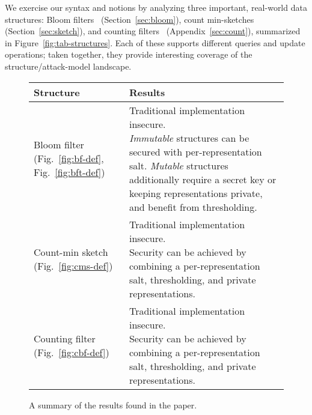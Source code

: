 
We exercise our syntax and notions by analyzing three important, real-world data
structures: Bloom filters~\cite{bloom1970space} (Section~\ref{sec:bloom}), count
min-sketches~\cite{cormode2005improved} (Section~\ref{sec:sketch}), and counting
filters~\cite{fan2000summary} (Appendix~\ref{sec:count}), summarized in
Figure~\ref{fig:tab-structures}. Each of these supports different queries and
update operations; taken together, they provide interesting coverage
of the structure/attack-model landscape.

\begin{figure}[tp]
\begin{center}
\small
  \begin{tabular}{ |p{2.5cm} | p{5cm}|}
    \hline
    {\bf Structure} & {\bf Results}\\ \hline
    \parbox[c][2.4cm]{2.5cm}{Bloom filter (Fig.~\ref{fig:bf-def}, Fig.~\ref{fig:bft-def})}
          & \parbox[c][2cm]{5cm}{Traditional implementation insecure.\\\emph{Immutable} structures can be secured with per-representation salt. \emph{Mutable} structures additionally require a secret key or\\keeping representations private, and benefit from thresholding.}
          \\ \hline
     \parbox[c]{2cm}{Count-min sketch (Fig.~\ref{fig:cms-def})}
          & \parbox[c][1.6cm]{5cm}{Traditional implementation insecure.\\Security can be achieved by combining a per-representation salt, thresholding, and private representations.}
          \\ \hline
    \parbox[c]{2cm}{Counting filter (Fig.~\ref{fig:cbf-def})}
          & \parbox[c][1.6cm]{5cm}{Traditional implementation insecure.\\Security can be achieved by combining a per-representation salt, thresholding, and private representations.}
         \\ \hline
  \end{tabular}
\caption{A summary of the results found in the paper.}
  \label{fig:results-summary}
\end{center}
\end{figure}

